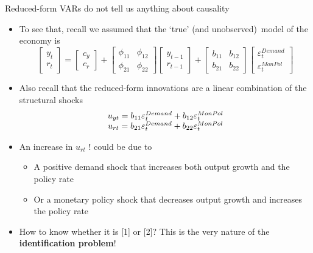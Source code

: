 \documentclass[10pt,handout]{beamer}
\begin{document}
\begin{frame}[t]
{Reduced-form VARs do not tell us anything about causality}
\begin{itemize}
\item To see that, recall we assumed that the `true' (and unobserved)\ model of the economy is%
\begin{equation*}
\begin{bmatrix}
y_{t} \\
r_{t}%
\end{bmatrix}%
=%
\begin{bmatrix}
c_{y} \\
c_{r}%
\end{bmatrix}%
+%
\begin{bmatrix}
\phi _{11} & \phi _{12} \\
\phi _{21} & \phi _{22}%
\end{bmatrix}%
\begin{bmatrix}
y_{t-1} \\
r_{t-1}%
\end{bmatrix}%
+%
\begin{bmatrix}
b_{11} & b_{12} \\
b_{21} & b_{22}%
\end{bmatrix}%
\begin{bmatrix}
\varepsilon_{t}^{Demand} \\
\varepsilon_{t}^{MonPol}%
\end{bmatrix}%
\end{equation*}
\pause
\item Also recall that the reduced-form innovations are a linear combination of the structural shocks
\begin{equation*}
\begin{array}{c}
u_{yt}=b_{11}\varepsilon_{t}^{Demand}+b_{12}\varepsilon_{t}^{MonPol}{%
\mathbf{\medskip }} \\ 
u_{rt}=b_{21}\varepsilon_{t}^{Demand}+b_{22}\varepsilon_{t}^{MonPol}%
\end{array}%
\end{equation*}%
\pause
\item An increase in $u_{rt}$ ! could be due to \smallskip
\begin{itemize}
\item[{[1]}] A positive demand shock that increases both output growth and the policy rate \smallskip
\item[{[2]}] Or a monetary policy shock that decreases output growth and increases the policy rate \medskip
\end{itemize}
\pause
\item How to know whether it is {\small \color{title}[1]} or {\small\color{title}[2]}? This is the very nature of the \textbf{identification problem}!
\end{itemize}
\end{frame}
\shownotesblock{}
\end{document}
